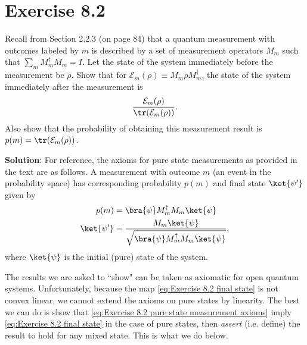 \documentclass{book}
\newcommand{\mc}[1]{\mathcal{#1}}
\begin{document}
\section*{Exercise 8.2} 
    Recall from Section 2.2.3 (on page 84) that a quantum measurement with outcomes labeled by $m$ is described by a set of measurement operators $M_m$ such that $\sum_m M_m^\dagger M_m = I$. Let the state of the system immediately before the measurement be $\rho$. Show that for $\mc{E}_m(\rho) \equiv M_m \rho M_m^\dagger$, the state of the system immediately after the measurement is
    \begin{align} \label{eq:Exercise 8.2 final state}
        \frac{\mc{E}_m(\rho)}{\tr(\mc{E}_m(\rho))}.
    \end{align}
    Also show that the probability of obtaining this measurement result is $p(m) = \tr(\mc{E}_m(\rho))$.
    
    \textbf{Solution}: For reference, the axioms for pure state measurements as provided in the text are as follows. A measurement with outcome $m$ (an event in the probability space) has corresponding probability $p(m)$ and final state $\ket{\psi'}$ given by
    \begin{align} \label{eq:Exercise 8.2 pure state measurement axioms}
    \begin{aligned} 
        p(m) &= \bra{\psi}M_m^\dagger M_m \ket{\psi} \\
        \ket{\psi'} &= \frac{M_m \ket{\psi}}{\sqrt{\bra{\psi}M_m^\dagger M_m \ket{\psi}}},
    \end{aligned}
    \end{align}
    where $\ket{\psi}$ is the initial (pure) state of the system.
    
    The results we are asked to ``show" can be taken as axiomatic for open quantum systems. Unfortunately, because the map \eqref{eq:Exercise 8.2 final state} is not convex linear, we cannot extend the axioms on pure states by linearity. The best we can do is show that \eqref{eq:Exercise 8.2 pure state measurement axioms} imply \eqref{eq:Exercise 8.2 final state} in the case of pure states, then \emph{assert} (i.e. define) the result to hold for any mixed state. This is what we do below.
    
\end{document}
